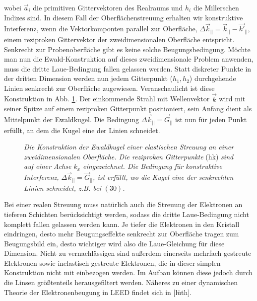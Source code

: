 wobei $\vec{a}_i$ die primitiven Gittervektoren des Realraums und $h_i$ die Millerschen Indizes
sind. In diesem Fall der Oberflächenstreuung erhalten wir konstruktive Interferenz,
wenn die Vektorkomponten parallel zur Oberfläche, $\Delta\vec{k}_{||}=\vec{k}_{||}-\vec{k'}_{||}$,
einem reziproken Gittervektor der zweidimensionalen Oberfläche entspricht. Senkrecht zur Probenoberfläche
gibt es keine solche Beugungsbedingung. Möchte man nun die Ewald-Konstruktion auf dieses
zweidimensionale Problem anwenden, muss die dritte Laue-Bedingung fallen gelassen werden. Statt
diskreter Punkte in der dritten Dimension werden nun jedem Gitterpunkt ($h_1, h_2$) durchgehende
Linien senkrecht zur Oberfläche zugewiesen. Veranschaulicht ist diese Konstruktion in Abb.
\ref{ewald}. Der einkommende Strahl mit Wellenvektor $\vec{k}$ wird mit seiner Spitze auf einem
reziproken Gitterpunkt positioniert, sein Anfang dient als Mittelpunkt der Ewaldkugel. Die
Bedingung $\Delta \vec{k}_{||}=\vec{G}_{||}$ ist nun für jeden Punkt erfüllt, an dem die Kugel eine
der Linien schneidet. 
\begin{figure}[H]
\centering

\caption{\textit{Die Konstruktion der Ewaldkugel einer elastischen Streuung an einer
zweidimensionalen Oberfläche. Die reziproken Gitterpunkte} (hk) \textit{sind auf einer Achse $k_x$
eingezeichnet. Die Bedingung für konstruktive Interferenz, $\Delta \vec{k}_{||}=\vec{G}_{||}$,  ist erfüllt, wo die Kugel eine der senkrechten Linien
schneidet, z.B. bei $(30)$. }}
\label{ewald}
\end{figure}

Bei einer realen Streuung muss natürlich auch die Streuung der Elektronen an tieferen
Schichten berücksichtigt werden, sodass die dritte Laue-Bedingung nicht komplett fallen gelassen werden
kann. Je tiefer die Elektronen in den Kristall eindringen, desto mehr Beugungseffekte senkrecht zur
Oberfläche tragen zum Beugungsbild ein, desto wichtiger wird also die Laue-Gleichung für diese
Dimension. Nicht zu vernachlässigen sind außerdem einerseits mehrfach gestreute Elektronen sowie
inelastisch gestreute Elektronen, die in dieser simplen Konstruktion nicht mit einbezogen werden. Im
Aufbau können diese jedoch durch die Linsen größtenteils herausgefiltert werden. Näheres zu einer dynamischen
Theorie der Elektronenbeugung in LEED findet sich in [lüth].

\FloatBarrier










